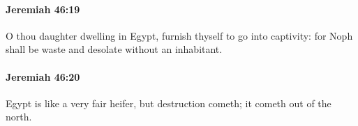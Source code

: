 		\paragraph{Jeremiah 46:19} %
			\label{JEREMIAH-46-19}

			O thou daughter dwelling in Egypt, furnish thyself to go into captivity: for Noph shall be waste and desolate without an inhabitant.


		\paragraph{Jeremiah 46:20} %
			\label{JEREMIAH-46-20}

			Egypt is like a very fair heifer, but destruction cometh; it cometh out of the north.


